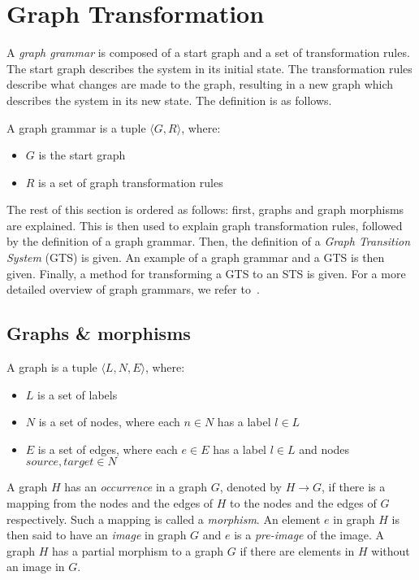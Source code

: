 \section{Graph Transformation}\label{sec:graph}
A \textit{graph grammar} is composed of a start graph and a set of transformation rules. The start graph describes the system in its initial state. The transformation rules describe what changes are made to the graph, resulting in a new graph which describes the system in its new state. The definition is as follows.

\begin{definition}
A graph grammar is a tuple $\langle G, R\rangle$, where:
\begin{itemize}
  \item $G$ is the start graph
  \item $R$ is a set of graph transformation rules
\end{itemize}
\end{definition} 

The rest of this section is ordered as follows: first, graphs and graph morphisms are explained. This is then used to explain graph transformation rules, followed by the definition of a graph grammar. Then, the definition of a \textit{Graph Transition System} (GTS) is given. An example of a graph grammar and a GTS is then given. Finally, a method for transforming a GTS to an STS is given. For a more detailed overview of graph grammars, we refer to~\cite{Rensink:graph_grammars, Heckel2006187, Andries1999}.

\subsection{Graphs \& morphisms}
\begin{definition}
A graph is a tuple $\langle L, N, E\rangle$, where:
\begin{itemize}
  \item $L$ is a set of labels
  \item $N$ is a set of nodes, where each $n \in N$ has a label $l \in L$
  \item $E$ is a set of edges, where each $e \in E$ has a label $l \in L$ and nodes $source,target \in N$
\end{itemize}
\end{definition}

A graph $H$ has an \textit{occurrence} in a graph $G$, denoted by $H \rightarrow G$, if there is a mapping from the nodes and the edges of $H$ to the nodes and the edges of $G$ respectively. Such a mapping is called a \textit{morphism}. An element $e$ in graph $H$ is then said to have an \textit{image} in graph $G$ and $e$ is a \textit{pre-image} of the image. A graph $H$ has a partial morphism to a graph $G$ if there are elements in $H$ without an image in $G$.

